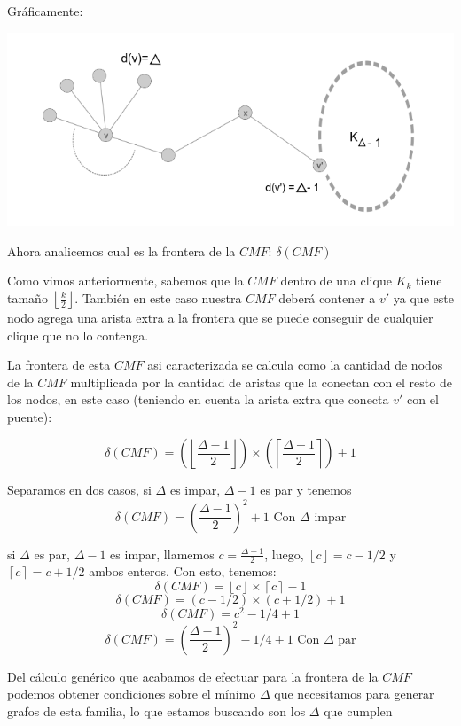 Gr\'aficamente:
\begin{center} 
	\includegraphics[scale = 0.6]{img/ej3/constructiva_golosa/vnotincmf_carac1.png} 
\end{center}

Ahora analicemos cual es la frontera de la $CMF$: $\delta (CMF)$

Como vimos anteriormente, sabemos que la $CMF$ dentro de una clique $K_k$ tiene tama\~no
$\left\lfloor \frac{k}{2} \right \rfloor$. Tambi\'en en este caso nuestra $CMF$ deber\'a
contener a $v'$ ya que este nodo agrega una arista extra a la frontera que se puede conseguir
de cualquier clique que no lo contenga.

La frontera de esta $CMF$ asi caracterizada se calcula como la cantidad de nodos de la $CMF$
multiplicada por la cantidad de aristas que la conectan con el resto de los nodos, en este caso
(teniendo en cuenta la arista extra que conecta $v'$ con el puente):

\[ \delta(CMF) = (\left\lfloor \frac{\Delta -1}{2} \right\rfloor) \times 
	(\left\lceil \frac{\Delta -1}{2} \right\rceil) + 1 \]

Separamos en dos casos, si $\Delta$ es impar, $\Delta -1$ es par y tenemos
\[ \boxed{\delta(CMF) = (\frac{\Delta -1}{2})^2 +1} \text{ Con $\Delta$ impar} \]

si $\Delta$ es par, $\Delta -1$ es impar, llamemos $c = \frac{\Delta -1}{2}$, luego, 
$\left\lfloor c \right\rfloor = c - 1/2$ y $\left\lceil c \right\rceil = c + 1/2$ 
ambos enteros. Con esto, tenemos:
\[ \delta(CMF) = \left\lfloor c \right\rfloor \times 
	\left\lceil c \right\rceil -1 \]
\[ \delta(CMF) = (c - 1/2) \times (c + 1/2) +1 \]
\[ \delta(CMF) = c^2 - 1/4 + 1 \]
\[ \boxed{\delta(CMF) = (\frac{\Delta -1 }{2})^2 -1/4 +1} \text{ Con $\Delta$ par}\]

Del c\'alculo gen\'erico que acabamos de efectuar para la frontera de la $CMF$
podemos obtener condiciones sobre el m\'inimo $\Delta$ que necesitamos para
generar grafos de esta familia, lo que estamos buscando son los $\Delta$ que cumplen


